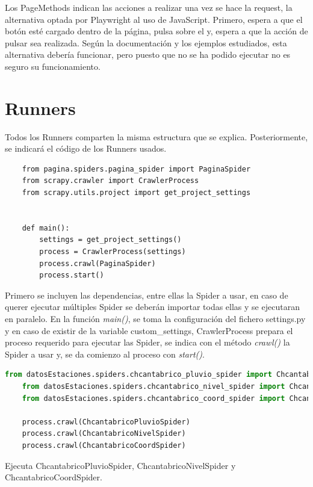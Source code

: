 Los PageMethods indican las acciones a realizar una vez se hace la request, la alternativa optada por Playwright al uso de JavaScript. Primero, espera a que el botón esté cargado dentro de la página, pulsa sobre el y, espera a que la acción de pulsar sea realizada.\newline
\newline
Según la documentación y los ejemplos estudiados, esta alternativa debería funcionar, pero puesto que no se ha podido ejecutar no es seguro su funcionamiento.

\section{Runners}
Todos los Runners comparten la misma estructura que se explica. Posteriormente, se indicará el código de los Runners usados.

\begin{lstlisting}
	from pagina.spiders.pagina_spider import PaginaSpider
	from scrapy.crawler import CrawlerProcess
	from scrapy.utils.project import get_project_settings
	
	
	def main():
		settings = get_project_settings()
		process = CrawlerProcess(settings)
		process.crawl(PaginaSpider)
		process.start()
\end{lstlisting}

Primero se incluyen las dependencias, entre ellas la Spider a usar, en caso de querer ejecutar múltiples Spider se deberán importar todas ellas y se ejecutaran en paralelo. En la función \textit{main()}, se toma la configuración del fichero settings.py y en caso de existir de la variable custom\_settings, CrawlerProcess prepara el proceso requerido para ejecutar las Spider, se indica con el método \textit{crawl()} la Spider a usar y, se da comienzo al proceso con \textit{start()}.

\begin{lstlisting}[language=Python, caption={CHCantábrico Data Runner}]
	from datosEstaciones.spiders.chcantabrico_pluvio_spider import ChcantabricoPluvioSpider
	from datosEstaciones.spiders.chcantabrico_nivel_spider import ChcantabricoNivelSpider
	from datosEstaciones.spiders.chcantabrico_coord_spider import ChcantabricoCoordSpider

	process.crawl(ChcantabricoPluvioSpider)
	process.crawl(ChcantabricoNivelSpider)
	process.crawl(ChcantabricoCoordSpider)
\end{lstlisting}

Ejecuta ChcantabricoPluvioSpider, ChcantabricoNivelSpider y ChcantabricoCoordSpider.

